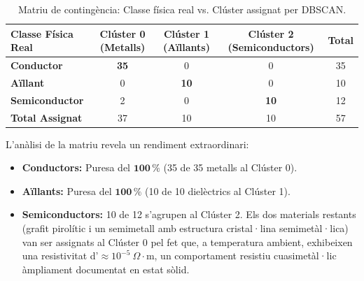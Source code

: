 \documentclass[a4paper,11pt]{article}
\begin{document}
\begin{table}[H]
\centering
\begin{tabular}{lcccc}
\toprule
\textbf{Classe Física Real} & \textbf{Clúster 0} (Metalls) & \textbf{Clúster 1} (Aïllants) & \textbf{Clúster 2} (Semiconductors) & \textbf{Total} \\
\midrule
\textbf{Conductor}          & \textbf{35}                  & 0                             & 0                                   & 35             \\
\textbf{Aïllant}            & 0                            & \textbf{10}                   & 0                                   & 10             \\
\textbf{Semiconductor}      & 2                            & 0                             & \textbf{10}                         & 12             \\
\midrule
\textbf{Total Assignat}     & 37                           & 10                            & 10                                  & 57             \\
\bottomrule
\end{tabular}
\caption{Matriu de contingència: Classe física real vs. Clúster assignat per DBSCAN.}
\label{tab:contingencia}
\end{table}

L'anàlisi de la matriu revela un rendiment extraordinari:
\begin{itemize}
    \item \textbf{Conductors:} Puresa del $\mathbf{100\,\%}$ (35 de 35 metalls al Clúster 0).
    \item \textbf{Aïllants:} Puresa del $\mathbf{100\,\%}$ (10 de 10 dielèctrics al Clúster 1).
    \item \textbf{Semiconductors:} 10 de 12 s'agrupen al Clúster 2. Els dos materials restants (grafit pirolític i un semimetall amb estructura cristal·lina semimetàl·lica) van ser assignats al Clúster 0 pel fet que, a temperatura ambient, exhibeixen una resistivitat d'$\approx 10^{-5}\ \Omega\cdot\text{m}$, un comportament resistiu cuasimetàl·lic àmpliament documentat en estat sòlid.
\end{itemize}
\end{document}
